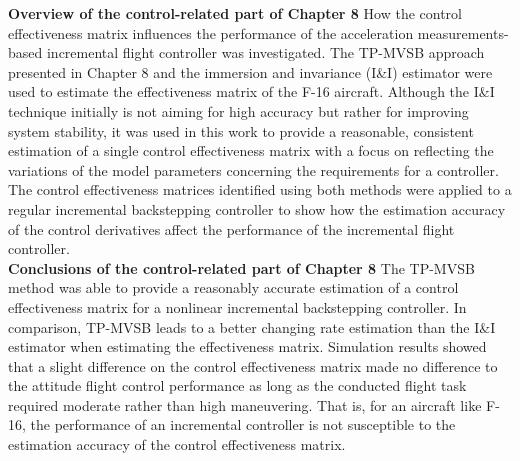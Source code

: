 \begin{shaded}
\end{shaded}
\vspace{-0.9cm}
\begin{shaded}
\end{shaded}

\noindent \textbf{Overview of the control-related part of Chapter 8} How the control effectiveness matrix influences the performance of the acceleration measurements-based incremental flight controller was investigated. The \ac{TP-MVSB} approach presented in Chapter 8 and the immersion and invariance (I\&I) estimator were used to estimate the effectiveness matrix of the F-16 aircraft. Although the I\&I technique initially is not aiming for high accuracy but rather for improving system stability, it was used in this work to provide a reasonable, consistent estimation of a single control effectiveness matrix with a focus on reflecting the variations of the model parameters concerning the requirements for a controller. The control effectiveness matrices identified using both methods were applied to a regular incremental backstepping controller to show how the estimation accuracy of the control derivatives affect the performance of the incremental flight controller.\\

\noindent \textbf{Conclusions of the control-related part of Chapter 8} The \ac{TP-MVSB} method was able to provide a reasonably accurate estimation of a control effectiveness matrix for a nonlinear incremental backstepping controller. In comparison, \ac{TP-MVSB} leads to a better changing rate estimation than the I\&I estimator when estimating the effectiveness matrix. 
Simulation results showed that a slight difference on the control effectiveness matrix made no difference to the attitude flight control performance as long as the conducted flight task required moderate rather than high maneuvering. That is, for an aircraft like F-16, the performance of an incremental controller is not susceptible to the estimation accuracy of the control effectiveness matrix.

\begin{shaded}
\end{shaded}
\vspace{-1.02cm}
\begin{shaded}
\end{shaded}


